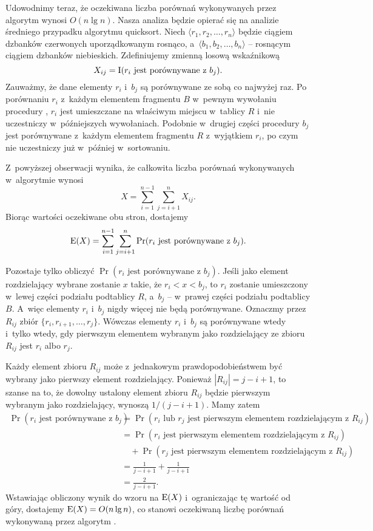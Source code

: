 Udowodnimy teraz, że oczekiwana liczba porównań wykonywanych przez algorytm  wynosi $O(n\lg n)$. Nasza analiza będzie opierać się na analizie średniego przypadku algorytmu quicksort. Niech $\langle r_1,r_2,\dots,r_n\rangle$ będzie ciągiem dzbanków czerwonych uporządkowanym rosnąco, a~$\langle b_1,b_2,\dots,b_n\rangle$ -- rosnącym ciągiem dzbanków niebieskich. Zdefiniujemy zmienną losową wskaźnikową
\[
    X_{ij} = \operatorname{I}(\text{$r_i$ jest porównywane z~$b_j$}).
\]
Zauważmy, że dane elementy $r_i$ i~$b_j$ są porównywane ze sobą co najwyżej raz. Po porównaniu $r_i$ z~każdym elementem fragmentu $B$ w~pewnym wywołaniu procedury , $r_i$ jest umieszczane na właściwym miejscu w~tablicy $R$ i~nie uczestniczy w~późniejszych wywołaniach. Podobnie w~drugiej części procedury $b_j$ jest porównywane z~każdym elementem fragmentu $R$ z~wyjątkiem $r_i$, po czym nie uczestniczy już w~później w~sortowaniu.

Z~powyższej obserwacji wynika, że całkowita liczba porównań wykonywanych w~algorytmie wynosi
\[
    X = \sum_{i=1}^{n-1}\sum_{j=i+1}^nX_{ij}.
\]
Biorąc wartości oczekiwane obu stron, dostajemy
\[
    \operatorname{E}(X) = \sum_{i=1}^{n-1}\sum_{j=i+1}^n\Pr(\text{$r_i$ jest porównywane z~$b_j$}).
\]

Pozostaje tylko obliczyć $\Pr(\text{$r_i$ jest porównywane z~$b_j$})$. Jeśli jako element rozdzielający wybrane zostanie $x$ takie, że $r_i<x<b_j$, to $r_i$ zostanie umieszczony w~lewej części podziału podtablicy $R$, a~$b_j$ -- w~prawej części podziału podtablicy $B$. A~więc elementy $r_i$ i~$b_j$ nigdy więcej nie będą porównywane. Oznaczmy przez $R_{ij}$ zbiór $\{r_i,r_{i+1},\dots,r_j\}$. Wówczas elementy $r_i$ i~$b_j$ są porównywane wtedy i~tylko wtedy, gdy pierwszym elementem wybranym jako rozdzielający ze zbioru $R_{ij}$ jest $r_i$ albo $r_j$.

Każdy element zbioru $R_{ij}$ może z~jednakowym prawdopodobieństwem być wybrany jako pierwszy element rozdzielający. Ponieważ $|R_{ij}|=j-i+1$, to szanse na to, że dowolny ustalony element zbioru $R_{ij}$ będzie pierwszym wybranym jako rozdzielający, wynoszą $1/(j-i+1)$. Mamy zatem
\begin{align*}
    \Pr(\text{$r_i$ jest porównywane z~$b_j$}) &= \Pr(\text{$r_i$ lub $r_j$ jest pierwszym elementem rozdzielającym z~$R_{ij}$}) \\
	&= \Pr(\text{$r_i$ jest pierwszym elementem rozdzielającym z~$R_{ij}$}) \\
	&\quad {}+\Pr(\text{$r_j$ jest pierwszym elementem rozdzielającym z~$R_{ij}$}) \\
	&= \frac{1}{j-i+1}+\frac{1}{j-i+1} \\
	&= \frac{2}{j-i+1}.
\end{align*}
Wstawiając obliczony wynik do wzoru na $\operatorname{E}(X)$ i~ograniczając tę wartość od góry, dostajemy $\operatorname{E}(X)=O(n\lg n)$, co stanowi oczekiwaną liczbę porównań wykonywaną przez algorytm .

